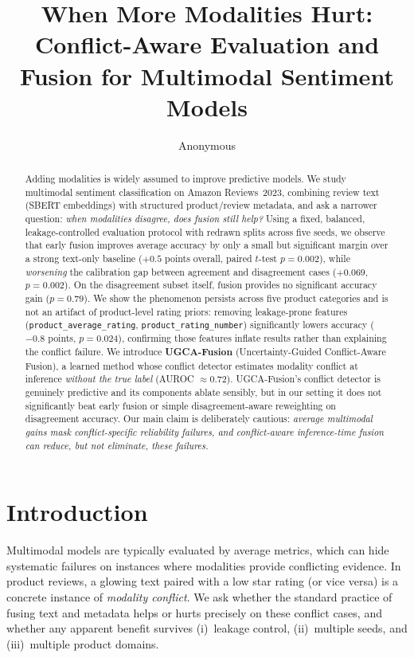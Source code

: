\documentclass[11pt]{article}
\title{When More Modalities Hurt: Conflict-Aware Evaluation and Fusion
for Multimodal Sentiment Models}
\author{Anonymous}
\date{}
\begin{document}
\maketitle

\begin{abstract}
Adding modalities is widely assumed to improve predictive models. We study
multimodal sentiment classification on Amazon Reviews~2023, combining review
text (SBERT embeddings) with structured product/review metadata, and ask a
narrower question: \emph{when modalities disagree, does fusion still help?}
Using a fixed, balanced, leakage-controlled evaluation protocol with redrawn
splits across five seeds, we observe that early fusion improves average accuracy
by only a small but significant margin over a strong text-only baseline
($+0.5$ points overall, paired $t$-test $p{=}0.002$), while \emph{worsening} the
calibration gap between agreement and disagreement cases ($+0.069$, $p{=}0.002$).
On the disagreement subset itself, fusion provides no significant accuracy gain
($p{=}0.79$). We show the phenomenon persists across five product categories and
is not an artifact of product-level rating priors: removing leakage-prone
features (\texttt{product\_average\_rating}, \texttt{product\_rating\_number})
significantly lowers accuracy ($-0.8$ points, $p{=}0.024$), confirming those
features inflate results rather than explaining the conflict failure. We
introduce \textbf{UGCA-Fusion} (Uncertainty-Guided Conflict-Aware Fusion), a
learned method whose conflict detector estimates modality conflict at inference
\emph{without the true label} (AUROC ${\approx}0.72$). UGCA-Fusion's conflict
detector is genuinely predictive and its components ablate sensibly, but in our
setting it does not significantly beat early fusion or simple
disagreement-aware reweighting on disagreement accuracy. Our main claim is
deliberately cautious: \emph{average multimodal gains mask conflict-specific
reliability failures, and conflict-aware inference-time fusion can reduce, but
not eliminate, these failures.}
\end{abstract}

\section{Introduction}
Multimodal models are typically evaluated by average metrics, which can hide
systematic failures on instances where modalities provide conflicting evidence.
In product reviews, a glowing text paired with a low star rating (or vice versa)
is a concrete instance of \emph{modality conflict}. We ask whether the standard
practice of fusing text and metadata helps or hurts precisely on these conflict
cases, and whether any apparent benefit survives (i)~leakage control,
(ii)~multiple seeds, and (iii)~multiple product domains.
\end{document}
